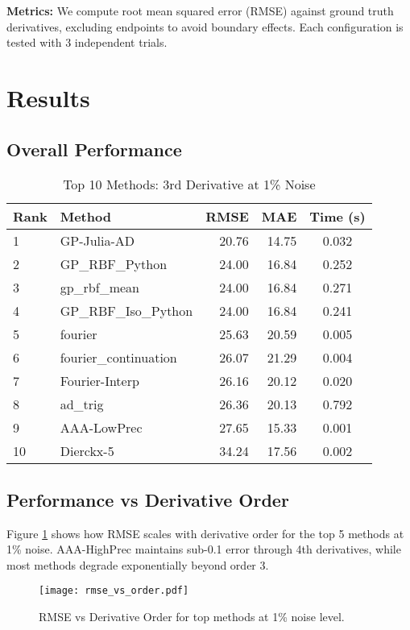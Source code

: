 \documentclass[11pt]{article}
\begin{document}
\textbf{Metrics:} We compute root mean squared error (RMSE) against ground truth derivatives, excluding endpoints to avoid boundary effects. Each configuration is tested with 3 independent trials.

\section{Results}

\subsection{Overall Performance}

\begin{table}[H]
\centering
\caption{Top 10 Methods: 3rd Derivative at 1\% Noise}
\begin{tabular}{llrrc}
\toprule
Rank & Method & RMSE & MAE & Time (s) \\
\midrule
1 & GP-Julia-AD & 20.76 & 14.75 & 0.032 \\
2 & GP\_RBF\_Python & 24.00 & 16.84 & 0.252 \\
3 & gp\_rbf\_mean & 24.00 & 16.84 & 0.271 \\
4 & GP\_RBF\_Iso\_Python & 24.00 & 16.84 & 0.241 \\
5 & fourier & 25.63 & 20.59 & 0.005 \\
6 & fourier\_continuation & 26.07 & 21.29 & 0.004 \\
7 & Fourier-Interp & 26.16 & 20.12 & 0.020 \\
8 & ad\_trig & 26.36 & 20.13 & 0.792 \\
9 & AAA-LowPrec & 27.65 & 15.33 & 0.001 \\
10 & Dierckx-5 & 34.24 & 17.56 & 0.002 \\
\bottomrule
\end{tabular}
\end{table}

\subsection{Performance vs Derivative Order}

Figure \ref{fig:rmse_order} shows how RMSE scales with derivative order for the top 5 methods at 1\% noise. AAA-HighPrec maintains sub-0.1 error through 4th derivatives, while most methods degrade exponentially beyond order 3.

\begin{figure}[H]
\centering
\texttt{[image: rmse\_vs\_order.pdf]}
\caption{RMSE vs Derivative Order for top methods at 1\% noise level.}
\label{fig:rmse_order}
\end{figure}
\end{document}
